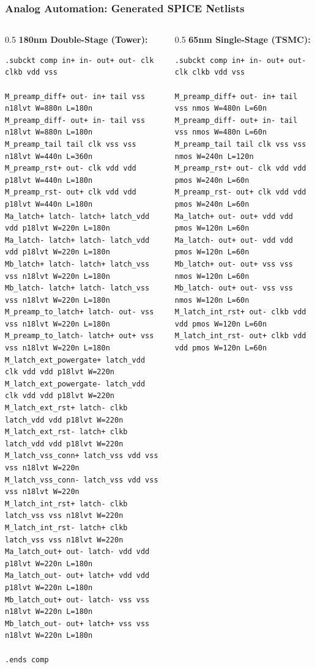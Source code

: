 \begin{frame}[fragile]
  \frametitle{Analog Automation: Generated SPICE Netlists}
  \begin{columns}
    \begin{column}{0.5\textwidth}
      \scriptsize
      \textbf{180nm Double-Stage (Tower):}
      \begin{lstlisting}[basicstyle=\ttfamily\fontsize{3.5}{4.5}\selectfont]
.subckt comp in+ in- out+ out- clk clkb vdd vss

M_preamp_diff+ out- in+ tail vss n18lvt W=880n L=180n
M_preamp_diff- out+ in- tail vss n18lvt W=880n L=180n
M_preamp_tail tail clk vss vss n18lvt W=440n L=360n
M_preamp_rst+ out- clk vdd vdd p18lvt W=440n L=180n
M_preamp_rst- out+ clk vdd vdd p18lvt W=440n L=180n
Ma_latch+ latch- latch+ latch_vdd vdd p18lvt W=220n L=180n
Ma_latch- latch+ latch- latch_vdd vdd p18lvt W=220n L=180n
Mb_latch+ latch- latch+ latch_vss vss n18lvt W=220n L=180n
Mb_latch- latch+ latch- latch_vss vss n18lvt W=220n L=180n
M_preamp_to_latch+ latch- out- vss vss n18lvt W=220n L=180n
M_preamp_to_latch- latch+ out+ vss vss n18lvt W=220n L=180n
M_latch_ext_powergate+ latch_vdd clk vdd vdd p18lvt W=220n
M_latch_ext_powergate- latch_vdd clk vdd vdd p18lvt W=220n
M_latch_ext_rst+ latch- clkb latch_vdd vdd p18lvt W=220n
M_latch_ext_rst- latch+ clkb latch_vdd vdd p18lvt W=220n
M_latch_vss_conn+ latch_vss vdd vss vss n18lvt W=220n
M_latch_vss_conn- latch_vss vdd vss vss n18lvt W=220n
M_latch_int_rst+ latch- clkb latch_vss vss n18lvt W=220n
M_latch_int_rst- latch+ clkb latch_vss vss n18lvt W=220n
Ma_latch_out+ out- latch- vdd vdd p18lvt W=220n L=180n
Ma_latch_out- out+ latch+ vdd vdd p18lvt W=220n L=180n
Mb_latch_out+ out- latch- vss vss n18lvt W=220n L=180n
Mb_latch_out- out+ latch+ vss vss n18lvt W=220n L=180n

.ends comp
      \end{lstlisting}
    \end{column}
    \begin{column}{0.5\textwidth}
      \scriptsize
      \textbf{65nm Single-Stage (TSMC):}
      \begin{lstlisting}[basicstyle=\ttfamily\fontsize{3.5}{4.5}\selectfont]
.subckt comp in+ in- out+ out- clk clkb vdd vss

M_preamp_diff+ out- in+ tail vss nmos W=480n L=60n
M_preamp_diff- out+ in- tail vss nmos W=480n L=60n
M_preamp_tail tail clk vss vss nmos W=240n L=120n
M_preamp_rst+ out- clk vdd vdd pmos W=240n L=60n
M_preamp_rst- out+ clk vdd vdd pmos W=240n L=60n
Ma_latch+ out- out+ vdd vdd pmos W=120n L=60n
Ma_latch- out+ out- vdd vdd pmos W=120n L=60n
Mb_latch+ out- out+ vss vss nmos W=120n L=60n
Mb_latch- out+ out- vss vss nmos W=120n L=60n
M_latch_int_rst+ out- clkb vdd vdd pmos W=120n L=60n
M_latch_int_rst- out+ clkb vdd vdd pmos W=120n L=60n


\end{lstlisting}
\end{column}
\end{columns}
\end{frame}
